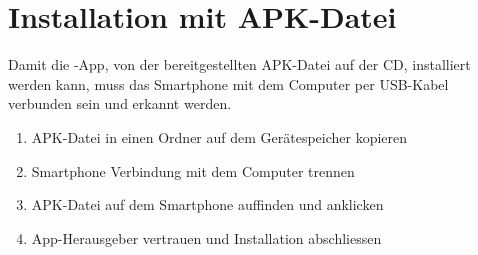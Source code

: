 \section{Installation mit APK-Datei}
Damit die -App, von der bereitgestellten APK-Datei auf der CD, installiert werden kann, muss das Smartphone mit dem Computer per USB-Kabel verbunden sein und erkannt werden. 

\begin{enumerate}
	\item APK-Datei in einen Ordner auf dem Gerätespeicher kopieren
	\item Smartphone Verbindung mit dem Computer trennen
	\item APK-Datei auf dem Smartphone auffinden und anklicken
	\item App-Herausgeber vertrauen und Installation abschliessen
\end{enumerate}
